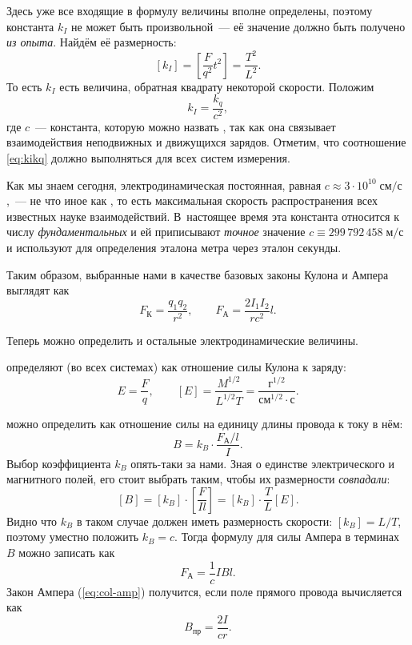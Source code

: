Здесь уже все входящие в формулу величины вполне определены,
поэтому константа $k_{I}$ не может быть произвольной~--- её значение
должно быть получено \emph{из опыта}. Найдём её размерность:
\[
\left[k_{I}\right]=\left[\frac{F}{q^{2}}t^{2}\right]=\frac{T^{2}}{L^{2}}.
\]
То есть $k_{I}$ есть величина, обратная квадрату некоторой скорости.
Положим
\begin{equation}
k_{I}=\frac{k_{q}}{c^{2}},\label{eq:kikq}
\end{equation}
где $c$~--- константа, которую можно назвать , так как она связывает взаимодействия неподвижных и движущихся
зарядов. Отметим, что соотношение \ref{eq:kikq} должно выполняться
для всех систем измерения.

Как мы знаем сегодня, электродинамическая постоянная,
равная $c\approx3\cdot10^{10}\;\text{см}/\text{с}$,~--- не что иное
как , то есть максимальная скорость
распространения всех известных науке взаимодействий. В~настоящее время
эта константа относится к числу \emph{фундаментальных} и ей приписывают
\emph{точное} значение $c\equiv299\,792\,458\;\text{м/с}$
и используют для определения эталона метра через эталон секунды.

Таким образом, выбранные нами в качестве базовых законы Кулона и Ампера
выглядят как
\begin{equation}
F_{\text{К}}=\frac{q_{1}q_{2}}{r^{2}},\qquad F_{\text{А}}=\frac{2I_{1}I_{2}}{rc^{2}}l.\label{eq:col-amp}
\end{equation}

Теперь можно определить и остальные электродинамические величины.

 определяют (во всех системах)
как отношение силы Кулона к заряду:
\[
E=\frac{F}{q},\qquad\left[E\right]=\frac{M^{1/2}}{L^{1/2}T}=\frac{\text{г}^{1/2}}{\text{см}^{1/2}\cdot\text{с}}.
\]

 можно определить как отношение силы
на единицу длины провода к току в нём:
\begin{equation}
B=k_{B}\cdot\frac{F_{\text{А}}/l}{I}.\label{eq:kB}
\end{equation}
Выбор коэффициента $k_{B}$ опять-таки за нами. Зная о единстве электрического
и магнитного полей, его стоит выбрать таким, чтобы их размерности
\emph{совпадали}:
\[
\left[B\right]=\left[k_{B}\right]\cdot\left[\frac{F}{Il}\right]=\left[k_{B}\right]\cdot\frac{T}{L}\left[E\right].
\]
Видно что $k_{B}$ в таком случае должен иметь размерность скорости:
$\left[k_{B}\right]=L/T$, поэтому уместно положить $k_{B}=c$. Тогда
формулу для силы Ампера в терминах $B$ можно записать как
\begin{equation}
F_{\text{А}}=\frac{1}{c}IBl.
\end{equation}
Закон Ампера (\ref{eq:col-amp}) получится, если поле прямого провода
вычисляется как
\[
B_{\text{пр}}=\dfrac{2I}{cr}.
\]

